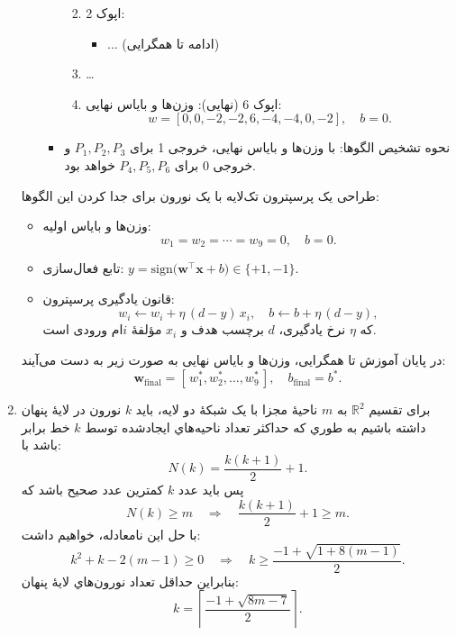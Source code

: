 \begin{enumerate}
\begin{enumerate}
\begin{itemize}
\begin{enumerate}
\begin{itemize}
				\end{itemize}
				\item اپوک 2:
				\begin{itemize}
					\item ... (ادامه تا همگرایی)
				\end{itemize}
				\item \dots
				\item اپوک 6 (نهایی): وزن‌ها و بایاس نهایی:
				\[ w = [0,0,-2,-2,6,-4,-4,0,-2],\quad b = 0. \]
			\end{enumerate}
			\item نحوه تشخیص الگوها: با وزن‌ها و بایاس نهایی، خروجی 1 برای $P_1,P_2,P_3$ و خروجی 0 برای $P_4,P_5,P_6$ خواهد بود.
		\end{itemize}
	\end{enumerate}
	طراحی یک پرسپترون تک‌لایه با یک نورون برای جدا کردن این الگوها:
	
	\begin{itemize}
		\item وزن‌ها و بایاس اولیه:
		\[
		w_1 = w_2 = \cdots = w_9 = 0,\quad b = 0.
		\]
		\item تابع فعال‌سازی: 
		\(\displaystyle
		y = \mathrm{sign}\bigl(\mathbf{w}^\top \mathbf{x} + b\bigr)
		\in\{+1,-1\}.
		\)
		\item قانون یادگیری پرسپترون:
		\[
		w_i \leftarrow w_i + \eta\,(d - y)\,x_i,
		\quad
		b \leftarrow b + \eta\,(d - y),
		\]
		که \(\eta\) نرخ یادگیری، \(d\) برچسب هدف و \(x_i\) مؤلفهٔ \(i\)ام ورودی است.
	\end{itemize}
	
	
	
	در پایان آموزش تا همگرایی، وزن‌ها و بایاس نهایی به صورت زیر به دست می‌آیند:
	\[
	\mathbf{w}_{\mathrm{final}} = [\,w_1^*, w_2^*, \dots, w_9^*\,],
	\quad
	b_{\mathrm{final}} = b^*.
	\]
	
	
	\item  
	برای تقسيم $\mathbb{R}^2$ به $m$ ناحيهٔ مجزا با يک شبکهٔ دو لايه، بايد $k$ نورون در لايهٔ پنهان داشته باشيم به طوري که حداکثر تعداد ناحيه‌هاي ايجادشده توسط $k$ خط برابر باشد با:
	\[
	N(k)=\frac{k(k+1)}{2}+1.
	\]
	پس بايد عدد $k$ کمترين عدد صحيح باشد که
	\[
	N(k)\ge m\quad\Longrightarrow\quad \frac{k(k+1)}{2}+1\ge m.
	\]
	با حل اين نامعادله، خواهيم داشت:
	\[
	k^2 + k -2(m-1)\ge 0
	\quad\Longrightarrow\quad k\ge \frac{-1+\sqrt{1+8(m-1)}}{2}.
	\]
	بنابراين حداقل تعداد نورون‌هاي لايهٔ پنهان:
	\[
	k=\left\lceil\frac{-1+\sqrt{8m-7}}{2}\right\rceil.
	\]
	

\end{enumerate}
